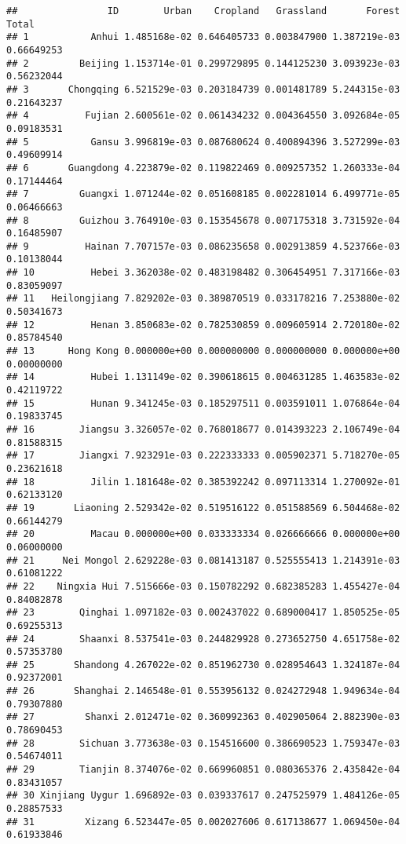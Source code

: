 \documentclass[
]{article}
\begin{document}
\begin{verbatim}
##                ID        Urban    Cropland   Grassland       Forest      Total
## 1           Anhui 1.485168e-02 0.646405733 0.003847900 1.387219e-03 0.66649253
## 2         Beijing 1.153714e-01 0.299729895 0.144125230 3.093923e-03 0.56232044
## 3       Chongqing 6.521529e-03 0.203184739 0.001481789 5.244315e-03 0.21643237
## 4          Fujian 2.600561e-02 0.061434232 0.004364550 3.092684e-05 0.09183531
## 5           Gansu 3.996819e-03 0.087680624 0.400894396 3.527299e-03 0.49609914
## 6       Guangdong 4.223879e-02 0.119822469 0.009257352 1.260333e-04 0.17144464
## 7         Guangxi 1.071244e-02 0.051608185 0.002281014 6.499771e-05 0.06466663
## 8         Guizhou 3.764910e-03 0.153545678 0.007175318 3.731592e-04 0.16485907
## 9          Hainan 7.707157e-03 0.086235658 0.002913859 4.523766e-03 0.10138044
## 10          Hebei 3.362038e-02 0.483198482 0.306454951 7.317166e-03 0.83059097
## 11   Heilongjiang 7.829202e-03 0.389870519 0.033178216 7.253880e-02 0.50341673
## 12          Henan 3.850683e-02 0.782530859 0.009605914 2.720180e-02 0.85784540
## 13      Hong Kong 0.000000e+00 0.000000000 0.000000000 0.000000e+00 0.00000000
## 14          Hubei 1.131149e-02 0.390618615 0.004631285 1.463583e-02 0.42119722
## 15          Hunan 9.341245e-03 0.185297511 0.003591011 1.076864e-04 0.19833745
## 16        Jiangsu 3.326057e-02 0.768018677 0.014393223 2.106749e-04 0.81588315
## 17        Jiangxi 7.923291e-03 0.222333333 0.005902371 5.718270e-05 0.23621618
## 18          Jilin 1.181648e-02 0.385392242 0.097113314 1.270092e-01 0.62133120
## 19       Liaoning 2.529342e-02 0.519516122 0.051588569 6.504468e-02 0.66144279
## 20          Macau 0.000000e+00 0.033333334 0.026666666 0.000000e+00 0.06000000
## 21     Nei Mongol 2.629228e-03 0.081413187 0.525555413 1.214391e-03 0.61081222
## 22    Ningxia Hui 7.515666e-03 0.150782292 0.682385283 1.455427e-04 0.84082878
## 23        Qinghai 1.097182e-03 0.002437022 0.689000417 1.850525e-05 0.69255313
## 24        Shaanxi 8.537541e-03 0.244829928 0.273652750 4.651758e-02 0.57353780
## 25       Shandong 4.267022e-02 0.851962730 0.028954643 1.324187e-04 0.92372001
## 26       Shanghai 2.146548e-01 0.553956132 0.024272948 1.949634e-04 0.79307880
## 27         Shanxi 2.012471e-02 0.360992363 0.402905064 2.882390e-03 0.78690453
## 28        Sichuan 3.773638e-03 0.154516600 0.386690523 1.759347e-03 0.54674011
## 29        Tianjin 8.374076e-02 0.669960851 0.080365376 2.435842e-04 0.83431057
## 30 Xinjiang Uygur 1.696892e-03 0.039337617 0.247525979 1.484126e-05 0.28857533
## 31         Xizang 6.523447e-05 0.002027606 0.617138677 1.069450e-04 0.61933846

\end{verbatim}
\end{document}
